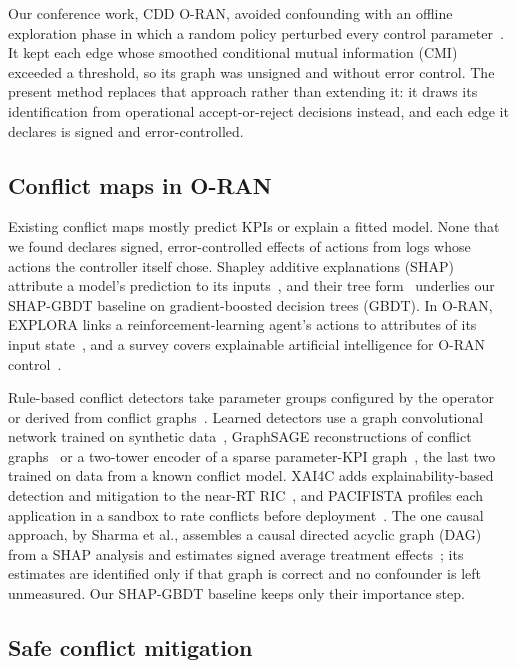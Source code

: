 Our conference work, CDD O-RAN, avoided confounding with an offline exploration phase in which a random policy
perturbed every control parameter~\cite{dahal2026cddoran}. It kept each edge whose smoothed conditional mutual
information (CMI) exceeded a threshold, so its graph was unsigned and without error control. The present method
replaces that approach rather than extending it: it draws its identification from operational accept-or-reject
decisions instead, and each edge it declares is signed and error-controlled.

\subsection{Conflict maps in O-RAN}
\label{sec:related_maps}

Existing conflict maps mostly predict KPIs or explain a fitted model. None that we found declares signed,
error-controlled effects of actions from logs whose actions the controller itself chose. Shapley additive
explanations (SHAP) attribute a model's prediction to its inputs~\cite{lundberg2017shap}, and their tree
form~\cite{lundberg2020trees} underlies our SHAP-GBDT baseline on gradient-boosted decision trees (GBDT). In O-RAN,
EXPLORA links a reinforcement-learning agent's actions to attributes of its input state~\cite{fiandrino2023explora},
and a survey covers explainable artificial intelligence for O-RAN control~\cite{brik2025xai}.

Rule-based conflict detectors take parameter groups configured by the operator~\cite{adamczyk2023conflict} or derived
from conflict graphs~\cite{wadud2025mobility}. Learned detectors use a graph convolutional network trained on
synthetic data~\cite{alshami2026conflict}, GraphSAGE reconstructions of conflict graphs~\cite{zolghadr2025conflict} or
a two-tower encoder of a sparse parameter-KPI graph~\cite{santos2026conflictairan}, the last two trained on data from
a known conflict model. XAI4C adds explainability-based detection and mitigation to the near-RT
RIC~\cite{varshney2025xai4c}, and PACIFISTA profiles each application in a sandbox to rate conflicts before
deployment~\cite{PACIFISTA}. The one causal approach, by Sharma et al., assembles a causal directed acyclic graph
(DAG) from a SHAP analysis and estimates signed average treatment effects~\cite{Sharma_2025}; its estimates are
identified only if that graph is correct and no confounder is left unmeasured. Our SHAP-GBDT baseline keeps only
their importance step.

\subsection{Safe conflict mitigation}
\label{sec:related_decisions}

